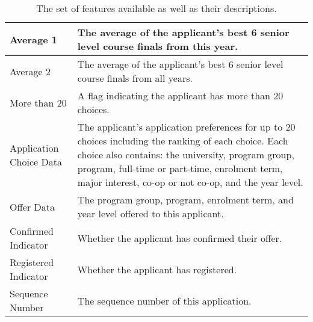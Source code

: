 \documentclass[titlepage]{article}
\begin{document}
\begin{table}[!hb]
\begin{center}
\begin{tabular}{| C{4cm} | C{10cm} |}
	Average 1						&The average of the applicant's best 6 senior level course finals from this year.\\\hline
	Average 2						&The average of the applicant's best 6 senior level course finals from all years.\\\hline
	More than 20					&A flag indicating the applicant has more than 20 choices.\\\hline
	Application Choice Data			&The applicant's application preferences for up to 20 choices including the ranking of each choice. Each choice also contains: the university, program group, program, full-time or part-time, enrolment term, major interest, co-op or not co-op, and the year level.\\\hline
	Offer Data						&The program group, program, enrolment term, and year level offered to this applicant.\\\hline
	Confirmed Indicator				&Whether the applicant has confirmed their offer.\\\hline
	Registered Indicator			&Whether the applicant has registered.\\\hline
	Sequence Number					&The sequence number of this application.\\\hline
\end{tabular}
\caption{The set of features available as well as their descriptions.}
\end{center}
\end{table}
\vspace*{\fill}
\newpage
\end{document}
